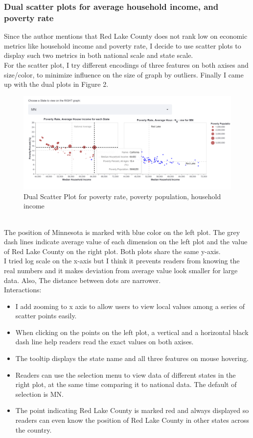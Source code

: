 \documentclass{article}
\begin{document}
\subsubsection*{Dual scatter plots for average household income, and poverty rate}
\noindent
Since the author mentions that Red Lake County does not rank low on economic metrics like household income and poverty rate, I decide to use scatter plots to display such two metrics in both national scale and state scale. \\
\noindent
For the scatter plot, I try different encodings of three features on both axises and size/color, to minimize influence on the size of graph by outliers. Finally I came up with the dual plots in Figure 2.
\begin{figure}[htbp]
    \centering
    \includegraphics[scale=0.55]{v2.png}
    \caption{Dual Scatter Plot for poverty rate, poverty population, household income}
\end{figure} \\
\noindent
The position of Minnesota is marked with blue color on the left plot. The grey dash lines indicate average value of each dimension on the left plot and the value of Red Lake County on the right plot. Both plots share the same y-axis. \\
\noindent
I tried log scale on the x-axis but I think it prevents readers from knowing the real numbers and it makes deviation from average value look smaller for large data. Also, The distance between dots are narrower. \\
Interactions:
\begin{itemize}
    \item I add zooming to x axis to allow users to view local values among a series of scatter points easily.
    \item When clicking on the points on the left plot, a vertical and a horizontal black dash line help readers read the exact values on both axises.
    \item The tooltip displays the state name and all three features on mouse hovering.
    \item Readers can use the selection menu to view data of different states in the right plot, at the same time comparing it to national data. The default of selection is MN. 
    \item The point indicating Red Lake County is marked red and always displayed so readers can even know the position of Red Lake County in other states across the country. 
\end{itemize}
\end{document}
